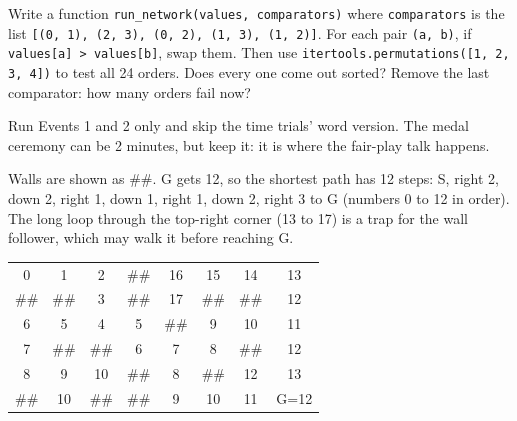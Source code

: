 \begin{stretchchallenge}
Write a function \texttt{run\_network(values, comparators)} where \texttt{comparators} is the list \texttt{[(0, 1), (2, 3), (0, 2), (1, 3), (1, 2)]}. For each pair \texttt{(a, b)}, if \texttt{values[a] > values[b]}, swap them. Then use \texttt{itertools.permutations([1, 2, 3, 4])} to test all 24 orders. Does every one come out sorted? Remove the last comparator: how many orders fail now?
\end{stretchchallenge}

\begin{teachernote}
Run Events 1 and 2 only and skip the time trials' word version. The medal ceremony can be 2 minutes, but keep it: it is where the fair-play talk happens.
\end{teachernote}

\begin{teachernote}
Walls are shown as \#\#. G gets 12, so the shortest path has 12 steps: S, right 2, down 2, right 1, down 1, right 1, down 2, right 3 to G (numbers 0 to 12 in order). The long loop through the top-right corner (13 to 17) is a trap for the wall follower, which may walk it before reaching G.
\begin{center}
\ttfamily\small
\begin{tabular}{cccccccc}
0 & 1 & 2 & \#\# & 16 & 15 & 14 & 13 \\
\#\# & \#\# & 3 & \#\# & 17 & \#\# & \#\# & 12 \\
6 & 5 & 4 & 5 & \#\# & 9 & 10 & 11 \\
7 & \#\# & \#\# & 6 & 7 & 8 & \#\# & 12 \\
8 & 9 & 10 & \#\# & 8 & \#\# & 12 & 13 \\
\#\# & 10 & \#\# & \#\# & 9 & 10 & 11 & G=12 \\
\end{tabular}
\end{center}
\end{teachernote}
